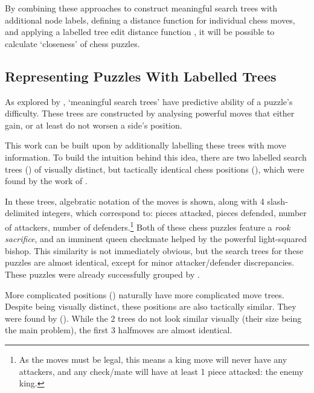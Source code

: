 By combining these approaches to construct meaningful search trees with
additional node labels, defining a distance function for individual chess
moves, and applying a labelled tree edit distance function
\citep{editDistTrees}, it will be possible to calculate `closeness' of chess
puzzles. 

\subsection{Representing Puzzles With Labelled Trees}\label{treeS11}

As explored by \citet{chessTrees}, `meaningful search trees' have predictive
ability of a puzzle's difficulty. These trees are constructed by analysing
powerful moves that either gain, or at least do not worsen a side's position. 

This work can be built upon by additionally labelling these trees with move
information. To build the intuition behind this idea, there are two labelled
search trees () of visually distinct, but tactically
identical chess positions (), which were found by the
work of \citet{chessMotifs}.

In these trees, algebratic notation of the moves is shown, along with 4
slash-delimited integers, which correspond to: pieces attacked, pieces
defended, number of attackers, number of defenders.\footnote{As the moves must
be legal, this means a king move will never have any attackers, and any
check/mate will have at least 1 piece attacked: the enemy king.} Both of these
chess puzzles feature a \emph{rook sacrifice}, and an imminent queen checkmate
helped by the powerful light-squared bishop. This similarity is not immediately
obvious, but the search trees for these puzzles are almost identical, except for
minor attacker/defender discrepancies. These puzzles were already successfully
grouped by \citet{chessMotifs}.

More complicated positions () naturally have more
complicated move trees. Despite being visually distinct, these positions are also
tactically similar. They were found by \citet{chessLanguage} ().
While the 2 trees do not look similar visually (their size being the main
problem), the first 3 halfmoves are almost identical. 

